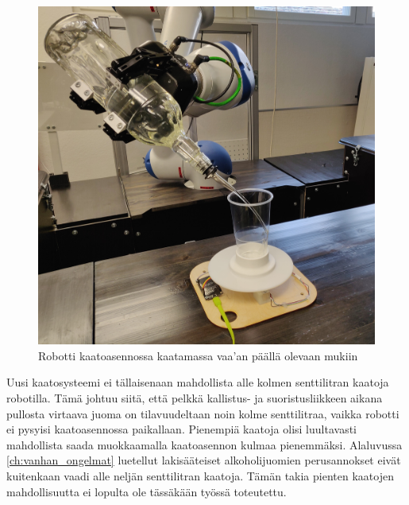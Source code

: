 \newpage

\begin{figure}[!h]
\begin{center}
\includegraphics[scale=0.1]{img/kaato.jpg}
\end{center}
\caption{Robotti kaatoasennossa kaatamassa vaa'an päällä olevaan mukiin}
\label{fig:kaato}
\end{figure}

Uusi kaatosysteemi ei tällaisenaan mahdollista alle kolmen senttilitran kaatoja robotilla. Tämä johtuu siitä, että pelkkä kallistus- ja suoristusliikkeen aikana pullosta virtaava juoma on tilavuudeltaan noin kolme senttilitraa, vaikka robotti ei pysyisi kaatoasennossa paikallaan. Pienempiä kaatoja olisi luultavasti mahdollista saada muokkaamalla kaatoasennon kulmaa pienemmäksi. Alaluvussa \ref{ch:vanhan_ongelmat} luetellut lakisääteiset alkoholijuomien perusannokset eivät kuitenkaan vaadi alle neljän senttilitran kaatoja. Tämän takia pienten kaatojen mahdollisuutta ei lopulta ole tässäkään työssä toteutettu.

